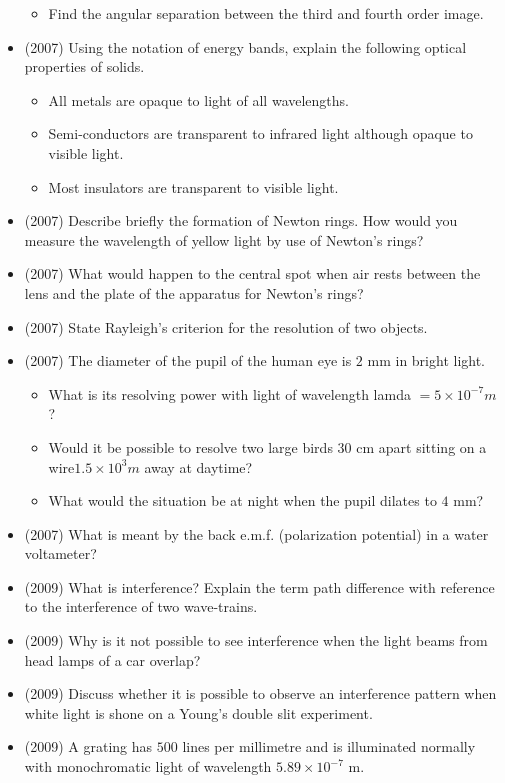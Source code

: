\documentclass{article}
\begin{document}
\begin{itemize}
\begin{itemize}
\item Find the angular separation between the third and fourth order image.
\end{itemize}
\item (2007)  Using the notation of energy bands, explain the following optical properties of solids.
 \begin{itemize}
\item  All metals are opaque to light of all wavelengths.
\item  Semi-conductors are transparent to infrared light although opaque to visible light.
\item  Most insulators are transparent to visible light.
\end{itemize}
\item (2007)  Describe briefly the formation of Newton rings. How would you measure the wavelength of yellow light by use of Newton’s rings? 
\item (2007)  What would happen to the central spot when air rests between the lens and the plate of the apparatus for Newton’s rings? 
\item (2007)  State Rayleigh’s criterion for the resolution of two objects. 
\item (2007)  The diameter of the pupil of the human eye is $ 2$ mm in bright light.
 \begin{itemize}
\item What is its resolving power with light of wavelength lamda $ =5 \times 10^{-7}m$ ? 
\item Would it be possible to resolve two large birds $ 30$ cm apart sitting on a wire$ 1.5 \times 10^{3}m$ away at daytime? 
\item What would the situation be at night when the pupil dilates to $ 4$ mm? 
\end{itemize}
\item (2007)  What is meant by the back e.m.f. (polarization potential) in a water voltameter? 
\item (2009)  What is interference?  Explain the term path difference with reference to the interference of two wave-trains.
\item (2009)  Why is it not possible to see interference when the light beams from head lamps of a car overlap?
\item (2009)  Discuss whether it is possible to observe an interference pattern when white light is shone on a Young’s double slit experiment.
\item (2009)  A grating has $ 500$ lines per millimetre and is illuminated normally with monochromatic light of wavelength $ 5.89 \times 10^{-7}$ m.

\end{itemize}
\end{document}

